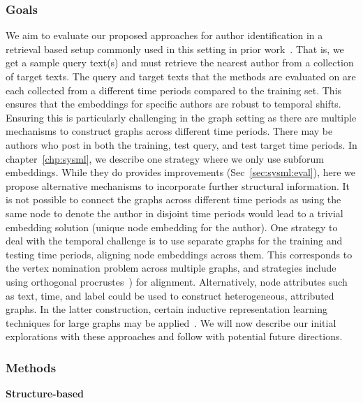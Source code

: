 \subsubsection{Goals}
We aim to evaluate our proposed approaches for author identification in a retrieval based setup commonly used in this setting in prior work~\cite{andrews2019learning,riverastao2021learning,khan2021deep,maneriker2021sysml}.
That is, we get a sample query text(s) and must retrieve the nearest author from a collection of target texts.
The query and target texts that the methods are evaluated on are each collected from a different time periods compared to the training set.
This ensures that the embeddings for specific authors are robust to temporal shifts.
Ensuring this is particularly challenging in the graph setting as there are multiple mechanisms to construct graphs across different time periods.
There may be authors who post in both the training, test query, and test target time periods.
In chapter~\ref{chp:sysml}, we describe one strategy where we only use subforum embeddings.
While they do provides improvements (Sec~\ref{sec:sysml:eval}), here we propose alternative mechanisms to incorporate further structural information.
It is not possible to connect the graphs across different time periods as using the same node to denote the author in disjoint time periods would lead to a trivial embedding solution (unique node embedding for the author).
One strategy to deal with the temporal challenge is to use separate graphs for the training and testing time periods, aligning node embeddings across them.
This corresponds to the vertex nomination problem across multiple graphs, and strategies include using orthogonal procrustes~\cite{agterberg2020vertex}) for alignment.
Alternatively, node attributes such as text, time, and label could be used to construct heterogeneous, attributed graphs.
In the latter construction, certain inductive representation learning techniques for large graphs may be applied~\cite{hamilton2017inductive,xu2020inductive}.
We will now describe our initial explorations with these approaches and follow with potential future directions.

\subsubsection{Methods}
\textbf{Structure-based}

